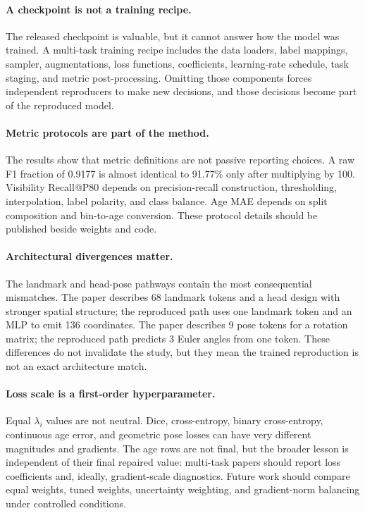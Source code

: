 \paragraph{A checkpoint is not a training recipe.}
The released \method checkpoint is valuable, but it cannot answer how the model was trained. A multi-task training recipe includes the data loaders, label mappings, sampler, augmentations, loss functions, coefficients, learning-rate schedule, task staging, and metric post-processing. Omitting those components forces independent reproducers to make new decisions, and those decisions become part of the reproduced model.

\paragraph{Metric protocols are part of the method.}
The results show that metric definitions are not passive reporting choices. A raw F1 fraction of 0.9177 is almost identical to 91.77\% only after multiplying by 100. Visibility Recall@P80 depends on precision-recall construction, thresholding, interpolation, label polarity, and class balance. Age MAE depends on split composition and bin-to-age conversion. These protocol details should be published beside weights and code.

\paragraph{Architectural divergences matter.}
The landmark and head-pose pathways contain the most consequential mismatches. The paper describes 68 landmark tokens and a head design with stronger spatial structure; the reproduced path uses one landmark token and an MLP to emit 136 coordinates. The paper describes 9 pose tokens for a rotation matrix; the reproduced path predicts 3 Euler angles from one token. These differences do not invalidate the study, but they mean the trained reproduction is not an exact architecture match.

\paragraph{Loss scale is a first-order hyperparameter.}
Equal $\lambda_i$ values are not neutral. Dice, cross-entropy, binary cross-entropy, continuous age error, and geometric pose losses can have very different magnitudes and gradients. The age rows are not final, but the broader lesson is independent of their final repaired value: multi-task papers should report loss coefficients and, ideally, gradient-scale diagnostics. Future work should compare equal weights, tuned weights, uncertainty weighting, and gradient-norm balancing under controlled conditions.

